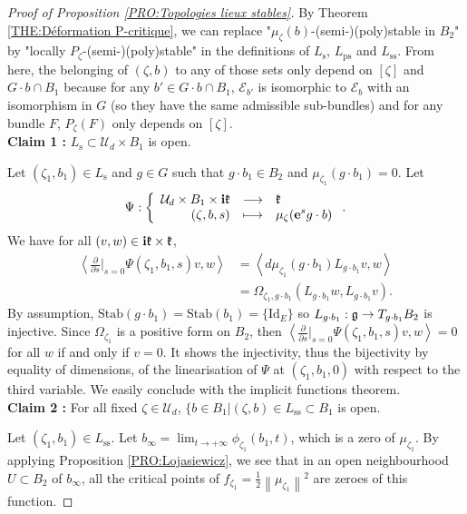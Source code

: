 \documentclass{article}
\theoremstyle{remark}
\theoremstyle{definition}
\newcommand{\Stab}{\mathrm{Stab}}
\newcommand{\Id}{\mathrm{Id}}
\renewcommand{\i}{\boldsymbol{\mathrm{i}}}
\newcommand{\e}{\boldsymbol{\mathrm{e}}}
\newcommand{\scal}[2]{\left< #1,#2 \right>}
\newcommand{\norme}[1]{\left\| #1 \right\|}
\newcommand{\E}{\mathcal{E}}
\newcommand{\mU}{\mathcal{U}}
\newcommand{\fonction}[4]{\left\{ \begin{array}{rcl}
		\displaystyle #1 & \longrightarrow & \displaystyle #2\\
		\displaystyle #3 & \longmapsto & \displaystyle #4
	\end{array} \right.}
\begin{document}
\begin{proof}[Proof of Proposition \ref{PRO:Topologies lieux stables}]
By Theorem \ref{THE:Déformation P-critique}, we can replace "$\mu_\zeta(b)$-(semi-)(poly)stable in $B_2$" by "locally $P_\zeta$-(semi-)(poly)stable" in the definitions of $L_{\mathrm{s}}$, $L_{\mathrm{ps}}$ and $L_{\mathrm{ss}}$. From here, the belonging of $(\zeta,b)$ to any of those sets only depend on $[\zeta]$ and $G \cdot b \cap B_1$ because for any $b' \in G \cdot b \cap B_1$, $\E_{b'}$ is isomorphic to $\E_b$ with an isomorphism in $G$ (so they have the same admissible sub-bundles) and for any bundle $F$, $P_\zeta(F)$ only depends on $[\zeta]$.\\

\noindent\textbf{Claim 1 :} $L_{\mathrm{s}} \subset \mU_d \times B_1$ is open.

Let $(\zeta_1,b_1) \in L_{\mathrm{s}}$ and $g \in G$ such that $g \cdot b_1 \in B_2$ and $\mu_{\zeta_1}(g \cdot b_1) = 0$. Let
$$
\Psi : \fonction{\mU_d \times B_1 \times \i\frak{k}}{\frak{k}}{(\zeta,b,s)}{\mu_{\zeta}(\e^sg \cdot b)}.
$$
We have for all $(v,w) \in \i\frak{k} \times \frak{k}$,
\begin{align*}
    \scal{\frac{\partial}{\partial s}|_{s = 0}\Psi(\zeta_1,b_1,s)v}{w} & = \scal{d\mu_{\zeta_1}(g \cdot b_1)L_{g \cdot b_1}v}{w}\\
    & = \Omega_{\zeta_1,g \cdot b_1}(L_{g \cdot b_1}w,L_{g \cdot b_1}v).
\end{align*}
By assumption, $\Stab(g \cdot b_1) = \Stab(b_1) = \{\Id_E\}$ so $L_{g \cdot b_1} : \frak{g} \rightarrow T_{g \cdot b_1}B_2$ is injective. Since $\Omega_{\zeta_1}$ is a positive form on $B_2$, then $\scal{\frac{\partial}{\partial s}|_{s = 0}\Psi(\zeta_1,b_1,s)v}{w} = 0$ for all $w$ if and only if $v = 0$. It shows the injectivity, thus the bijectivity by equality of dimensions, of the linearisation of $\Psi$ at $(\zeta_1,b_1,0)$ with respect to the third variable. We easily conclude with the implicit functions theorem.\\

\noindent\textbf{Claim 2 :} For all fixed $\zeta \in \mU_d$, $\{b \in B_1|(\zeta,b) \in L_{\mathrm{ss}} \subset B_1$ is open.

Let $(\zeta_1,b_1) \in L_{\mathrm{ss}}$. Let $b_\infty = \lim_{t \rightarrow +\infty} \phi_{\zeta_1}(b_1,t)$, which is a zero of $\mu_{\zeta_1}$. By applying Proposition \ref{PRO:Lojasiewicz}, we see that in an open neighbourhood $U \subset B_2$ of $b_\infty$, all the critical points of $f_{\zeta_1} = \frac{1}{2}\norme{\mu_{\zeta_1}}^2$ are zeroes of this function.


\end{proof}
\end{document}
